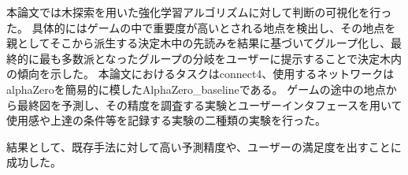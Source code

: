 \abstract
本論文では木探索を用いた強化学習アルゴリズムに対して判断の可視化を行った。
具体的にはゲームの中で重要度が高いとされる地点を検出し、その地点を親としてそこから派生する決定木中の先読みを結果に基づいてグループ化し、最終的に最も多数派となったグループの分岐をユーザーに提示することで決定木内の傾向を示した。
本論文におけるタスクはconnect4、使用するネットワークはalphaZeroを簡易的に模したAlphaZero_baseline\cite{oord2016wavenet}である。
ゲームの途中の地点から最終図を予測し、その精度を調査する実験とユーザーインタフェースを用いて使用感や上達の条件等を記録する実験の二種類の実験を行った。

結果として、既存手法に対して高い予測精度や、ユーザーの満足度を出すことに成功した。
